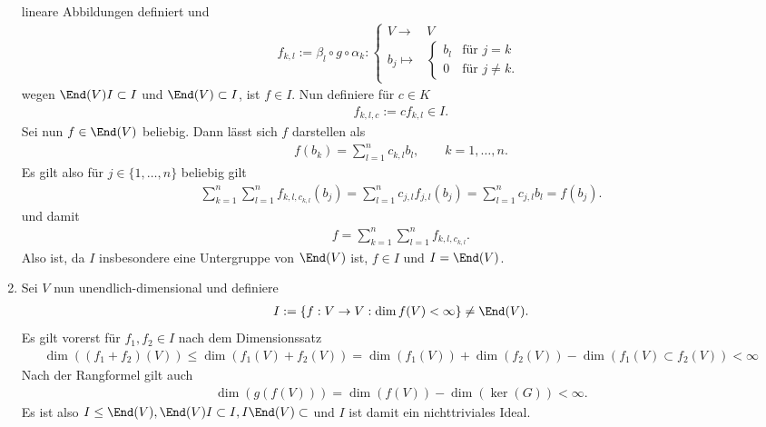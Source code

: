 \begin{solution}
\begin{enumerate}
  lineare Abbildungen definiert und
  \begin{align*}
    f_{k,l} := \beta_l \circ g \circ \alpha_k: \begin{cases}
      V \rightarrow & V \\
      b_j \mapsto & \begin{cases}
      b_l & \text{für } j = k\\
      0 & \text{für } j \neq k.
      \end{cases}
    \end{cases}
  \end{align*}
  wegen $\End(V)I \subset I$ und $\End(V) \subset I$, ist $f \in I$. Nun definiere
  für $c \in K$
  \begin{align*}
    f_{k,l,c} := c f_{k,l} \in I.
  \end{align*}
  Sei nun $f \in \End(V)$ beliebig. Dann lässt sich $f$ darstellen als
  \begin{align*}
    f(b_k) = \sum_{l=1}^n c_{k,l}b_l, \qquad k = 1,\dots,n.
  \end{align*}
  Es gilt also für $j \in \{1,\dots,n\}$ beliebig gilt
  \begin{align*}
    \sum_{k = 1}^n \sum_{l = 1}^n f_{k,l,c_{k,l}}(b_j) = \sum_{l=1}^n c_{j,l}f_{j,l}(b_j)
    = \sum_{l = 1}^n c_{j,l} b_l = f(b_j).
  \end{align*}
  und damit
  \begin{align*}
    f = \sum_{k=1}^n\sum_{l=1}^n f_{k,l,c_{k,l}}.
  \end{align*}
  Also ist, da $I$ insbesondere eine Untergruppe von $\End(V)$ ist, $f \in I$ und $I = \End(V)$.
  \item Sei $V$ nun unendlich-dimensional und definiere
  \begin{align*}
    I := \{f: V \rightarrow V: \dim f(V) < \infty \} \neq \End(V).
  \end{align*}
  Es gilt vorerst für $f_1,f_2 \in I$
  nach dem Dimensionssatz
  \begin{align*}
    \dim((f_1 + f_2)(V)) \leq \dim(f_1(V) + f_2(V)) =
    \dim(f_1(V)) + \dim(f_2(V)) - \dim(f_1(V)\subset f_2(V)) < \infty
  \end{align*}
  Nach der Rangformel gilt auch
  \begin{align*}
    \dim(g(f(V))) = \dim(f(V)) - \dim(\ker (G)) < \infty.
  \end{align*}
  Es ist also $I \leq \End(V), \End(V)I \subset I, I\End(V) \subset$ und $I$
  ist damit ein nichttriviales Ideal.
\end{enumerate}
\end{solution}
